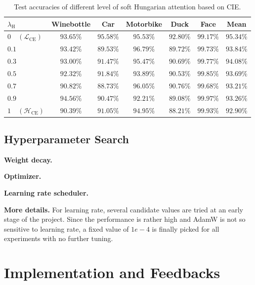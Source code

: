 \documentclass[a4paper]{article}
\begin{document}
\begin{table}[htbp]
    \centering
    \begin{tabular}{lcccccc}
        \toprule
        $\lambda_{\mathrm{H}}$& Winebottle& Car& Motorbike& Duck& Face& Mean\\
        \midrule
        $0\quad (\mathcal{L}_{\mathrm{CE}})$&$93.65\%$& $\mathbf{95.58\%}$& $95.53\%$& $\mathbf{92.80\%}$& $99.17\%$& $\mathbf{95.34\%}$\\
        $0.1$& $93.42\%$& $89.53\%$& $96.79\%$& $89.72\%$& $99.73\%$& $93.84\%$\\
        $0.3$& $93.00\%$& $91.47\%$& $95.47\%$& $90.69\%$& $99.77\%$& $94.08\%$\\
        $0.5$& $92.32\%$& $91.84\%$& $93.89\%$& $90.53\%$& $99.85\%$& $93.69\%$\\
        $0.7$& $90.82\%$& $88.73\%$& $\mathbf{96.05\%}$& $90.76\%$& $99.68\%$& $93.21\%$\\
        $0.9$& $\mathbf{94.56\%}$& $90.47\%$& $92.21\%$& $89.08\%$& $\mathbf{99.97\%}$& $93.26\%$\\
        $1\quad (\mathcal{H}_{\mathrm{CE}})$& $90.39\%$& $91.05\%$& $94.95\%$& $88.21\%$& $99.93\%$& $92.90\%$\\
        \bottomrule
        
    \end{tabular}
    \caption{Test accuracies of different level of soft Hungarian attention based on CIE.}
    \label{tab:hungarian}
\end{table}

\subsection{Hyperparameter Search}
\textbf{Weight decay.}

\textbf{Optimizer.}

\textbf{Learning rate scheduler.}

\textbf{More details.}
For learning rate, several candidate values are tried at an early stage of the project. Since the performance is rather high and AdamW is not so sensitive to learning rate, a fixed value of $1e-4$ is finally picked for all experiments with no further tuning.



\section{Implementation and Feedbacks}
\end{document}
